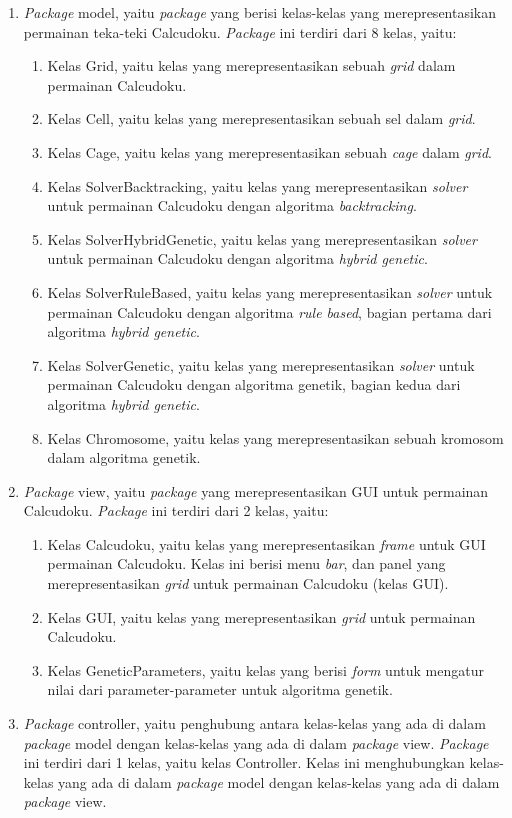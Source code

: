 \begin{enumerate}
\item \textit{Package} model, yaitu \textit{package} yang berisi kelas-kelas yang merepresentasikan permainan teka-teki Calcudoku. \textit{Package} ini terdiri dari 8 kelas, yaitu:
	\begin{enumerate}
	\item Kelas Grid, yaitu kelas yang merepresentasikan sebuah \textit{grid} dalam permainan Calcudoku.
	\item Kelas Cell, yaitu kelas yang merepresentasikan sebuah sel dalam \textit{grid}.
	\item Kelas Cage, yaitu kelas yang merepresentasikan sebuah \textit{cage} dalam \textit{grid}.
	\item Kelas SolverBacktracking, yaitu kelas yang merepresentasikan \textit{solver} untuk permainan Calcudoku dengan algoritma \textit{backtracking}.
	\item Kelas SolverHybridGenetic, yaitu kelas yang merepresentasikan \textit{solver} untuk permainan Calcudoku dengan algoritma \textit{hybrid genetic}.
	\item Kelas SolverRuleBased, yaitu kelas yang merepresentasikan \textit{solver} untuk permainan Calcudoku dengan algoritma \textit{rule based}, bagian pertama dari algoritma \textit{hybrid genetic}.
	\item Kelas SolverGenetic, yaitu kelas yang merepresentasikan \textit{solver} untuk permainan Calcudoku dengan algoritma genetik, bagian kedua dari algoritma \textit{hybrid genetic}.
	\item Kelas Chromosome, yaitu kelas yang merepresentasikan sebuah kromosom dalam algoritma genetik.
	\end{enumerate}
\item \textit{Package} view, yaitu \textit{package} yang merepresentasikan GUI untuk permainan Calcudoku. \textit{Package} ini terdiri dari 2 kelas, yaitu:
	\begin{enumerate}
	\item Kelas Calcudoku, yaitu kelas yang merepresentasikan \textit{frame} untuk GUI permainan Calcudoku. Kelas ini berisi menu \textit{bar}, dan panel yang merepresentasikan \textit{grid} untuk permainan Calcudoku (kelas GUI).
	\item Kelas GUI, yaitu kelas yang merepresentasikan \textit{grid} untuk permainan Calcudoku.
	\item Kelas GeneticParameters, yaitu kelas yang berisi \textit{form} untuk mengatur nilai dari parameter-parameter untuk algoritma genetik.
	\end{enumerate}
\item \textit{Package} controller, yaitu penghubung antara kelas-kelas yang ada di dalam \textit{package} model dengan kelas-kelas yang ada di dalam \textit{package} view. \textit{Package} ini terdiri dari 1 kelas, yaitu kelas Controller. Kelas ini menghubungkan kelas-kelas yang ada di dalam  \textit{package} model dengan kelas-kelas yang ada di dalam \textit{package} view.
\end{enumerate}

